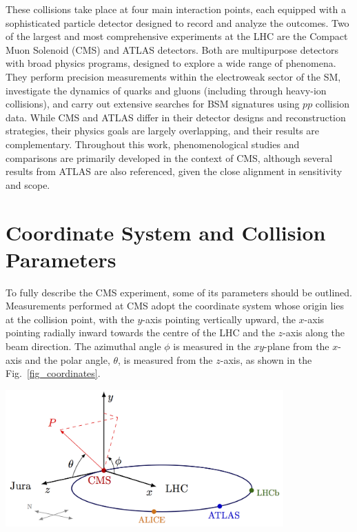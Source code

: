 These collisions take place at four main interaction points, each equipped with a sophisticated particle detector designed to record and analyze the outcomes. Two of the largest and most comprehensive experiments at the LHC are the Compact Muon Solenoid (CMS) and ATLAS detectors. Both are multipurpose detectors with broad physics programs, designed to explore a wide range of phenomena. They perform precision measurements within the electroweak sector of the SM, investigate the dynamics of quarks and gluons (including through heavy-ion collisions), and carry out extensive searches for BSM signatures using $pp$ collision data. While CMS and ATLAS differ in their detector designs and reconstruction strategies, their physics goals are largely overlapping, and their results are complementary. Throughout this work, phenomenological studies and comparisons are primarily developed in the context of CMS, although several results from ATLAS are also referenced, given the close alignment in sensitivity and scope.

\section{Coordinate System and Collision Parameters}
To fully describe the CMS experiment, some of its parameters should be outlined. Measurements performed at CMS adopt the coordinate system whose origin lies at the collision point, with the $y$-axis pointing vertically upward, the $x$-axis pointing radially inward towards the centre of the LHC and the $z$-axis along the beam direction. The azimuthal angle $\phi$ is measured in the $x y$-plane from the $x$-axis and the polar angle, $\theta$, is measured from the $z$-axis, as shown in the Fig.~\ref{fig_coordinates}. 
\begin{center}
	\includegraphics[width=0.8\textwidth]{Images/coordinatechart.png}
	\label{fig_coordinates}
\end{center}

